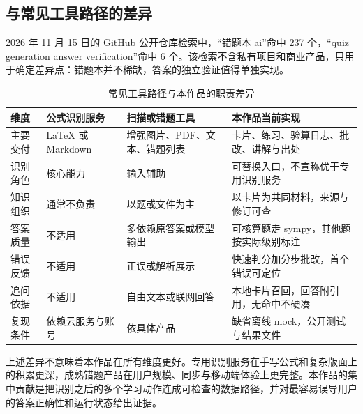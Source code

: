 \subsection{与常见工具路径的差异}

2026 年 11 月 15 日的 GitHub 公开仓库检索中，“错题本 ai”命中 237 个，“quiz generation answer verification”命中 6 个。该检索不含私有项目和商业产品，只用于确定差异点：错题本并不稀缺，答案的独立验证值得单独实现。

\begin{table}[H]
\centering\footnotesize
\caption{常见工具路径与本作品的职责差异}
\begin{tabularx}{\textwidth}{@{}L{2.7cm}L{3.7cm}L{3.7cm}Y@{}}
\toprule
\textbf{维度} & \textbf{公式识别服务} & \textbf{扫描或错题工具} & \textbf{本作品当前实现} \\
\midrule
主要交付 & LaTeX 或 Markdown & 增强图片、PDF、文本、错题列表 & 卡片、练习、验算日志、批改、讲解与出处 \\
识别角色 & 核心能力 & 输入辅助 & 可替换入口，不宣称优于专用识别服务 \\
知识组织 & 通常不负责 & 以题或文件为主 & 以卡片为共同材料，来源与修订可查 \\
答案质量 & 不适用 & 多依赖原答案或模型输出 & 可核算题走 sympy，其他题按实际级别标注 \\
错误反馈 & 不适用 & 正误或解析展示 & 快速判分加分步批改，首个错误可定位 \\
追问依据 & 不适用 & 自由文本或联网回答 & 本地卡片召回，回答附引用，无命中不硬凑 \\
复现条件 & 依赖云服务与账号 & 依具体产品 & 缺省离线 mock，公开测试与结果文件 \\
\bottomrule
\end{tabularx}
\end{table}

上述差异不意味着本作品在所有维度更好。专用识别服务在手写公式和复杂版面上的积累更深，成熟错题产品在用户规模、同步与移动端体验上更完整。本作品的集中贡献是把识别之后的多个学习动作连成可检查的数据路径，并对最容易误导用户的答案正确性和运行状态给出证据。
